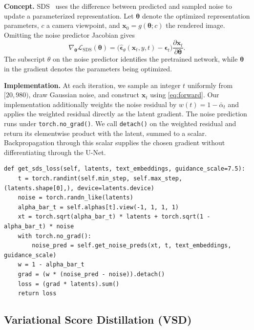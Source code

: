 \noindent\textbf{Concept.}
SDS~\cite{poole2023dreamfusion} uses the difference between predicted and sampled noise to update a
parameterized representation.
Let $\boldsymbol{\theta}$ denote the optimized representation parameters, $c$ a camera viewpoint,
and $\mathbf{x}_0=g(\boldsymbol{\theta};c)$ the rendered image.
Omitting the noise predictor Jacobian gives
\begin{equation}
 \nabla_{\boldsymbol{\theta}}\mathcal{L}_{\mathrm{SDS}}(\boldsymbol{\theta})
 =\bigl(\hat{\boldsymbol{\epsilon}}_\theta(\mathbf{x}_t,y,t)
        -\boldsymbol{\epsilon}_t\bigr)
   \frac{\partial\mathbf{x}_t}{\partial\boldsymbol{\theta}}.
 \label{eq:sds_gradient}
\end{equation}
The subscript $\theta$ on the noise predictor identifies the pretrained network, while
$\boldsymbol{\theta}$ in the gradient denotes the parameters being optimized.

\noindent\textbf{Implementation.}
At each iteration, we sample an integer $t$ uniformly from $[20,980)$, draw Gaussian noise, and
construct $\mathbf{x}_t$ using \cref{eq:forward}.
Our implementation additionally weights the noise residual by $w(t)=1-\bar\alpha_t$ and applies the
weighted residual directly as the latent gradient.
The noise prediction runs under \texttt{torch.no\_grad()}.
We call \texttt{detach()} on the weighted residual and return its elementwise product with the
latent, summed to a scalar.
Backpropagation through this scalar supplies the chosen gradient without differentiating through the
U-Net.

\begin{lstlisting}
def get_sds_loss(self, latents, text_embeddings, guidance_scale=7.5):
    t = torch.randint(self.min_step, self.max_step, (latents.shape[0],), device=latents.device)
    noise = torch.randn_like(latents)
    alpha_bar_t = self.alphas[t].view(-1, 1, 1, 1)
    xt = torch.sqrt(alpha_bar_t) * latents + torch.sqrt(1 - alpha_bar_t) * noise
    with torch.no_grad():
        noise_pred = self.get_noise_preds(xt, t, text_embeddings, guidance_scale)
    w = 1 - alpha_bar_t
    grad = (w * (noise_pred - noise)).detach()
    loss = (grad * latents).sum()
    return loss
\end{lstlisting}

\subsection{Variational Score Distillation (VSD)}
\label{sec:vsd}

